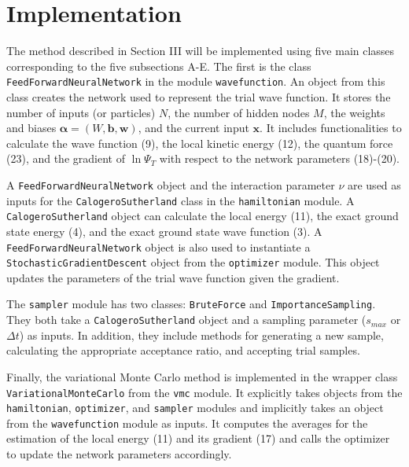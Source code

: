 \documentclass[prb,aps,twocolumn,showpacs,10pt]{revtex4-1}
\begin{document}

\section{Implementation}

The method described in Section III will be implemented using five main classes corresponding to the five subsections A-E. The first is the class \texttt{FeedForwardNeuralNetwork} in the module \texttt{wavefunction}. An object from this class creates the network used to represent the trial wave function. It stores the number of inputs (or particles) $N$, the number of hidden nodes $M$, the weights and biases $\bm{\alpha} = (W, \bm{b}, \bm{w})$, and the current input $\bm{x}$. It includes functionalities to calculate the wave function (9), the local kinetic energy (12), the quantum force (23), and the gradient of $\ln \Psi_T$ with respect to the network parameters (18)-(20).

A \texttt{FeedForwardNeuralNetwork} object and the interaction parameter $\nu$ are used as inputs for the \texttt{CalogeroSutherland} class in the \texttt{hamiltonian} module. A \texttt{CalogeroSutherland} object can calculate the local energy (11), the exact ground state energy (4), and the exact ground state wave function (3). A \texttt{FeedForwardNeuralNetwork} object is also used to instantiate a \texttt{StochasticGradientDescent} object from the \texttt{optimizer} module. This object updates the parameters of the trial wave function given the gradient. 

The \texttt{sampler} module has two classes: \texttt{BruteForce} and \texttt{ImportanceSampling}. They both take a \texttt{CalogeroSutherland} object and a sampling parameter ($s_{max}$ or $\Delta t$) as inputs. In addition, they include methods for generating a new sample, calculating the appropriate acceptance ratio, and accepting trial samples. 

Finally, the variational Monte Carlo method is implemented in the wrapper class \texttt{VariationalMonteCarlo} from the \texttt{vmc} module. It explicitly takes objects from the \texttt{hamiltonian}, \texttt{optimizer}, and \texttt{sampler} modules and implicitly takes an object from the \texttt{wavefunction} module as inputs. It computes the averages for the estimation of the local energy (11) and its gradient (17) and calls the optimizer to update the network parameters accordingly. 
\end{document}

